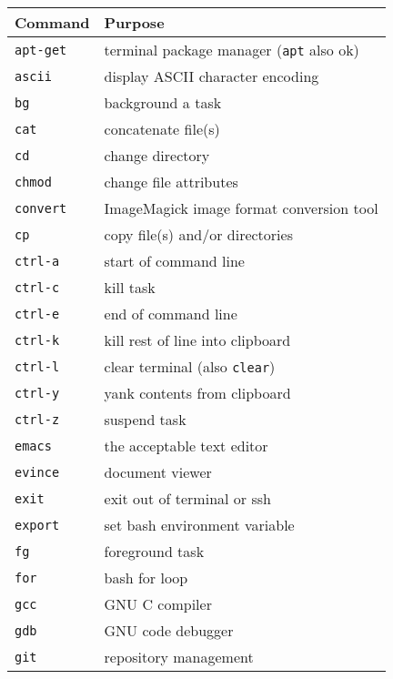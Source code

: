 \begin{table} %
    \centering
    \footnotesize
    \begin{tabular}{@{\makebox[3em][r]{\rownumber\space}}|l|l} \hline
    Command & Purpose \gdef\rownumber{\stepcounter{magicrownumbers}\arabic{magicrownumbers}} \\ \hline %
        \texttt{apt-get} & terminal package manager (\texttt{apt} also ok)\\
        \texttt{ascii} & display ASCII character encoding \\
        \texttt{bg} & background a task  \\
        \texttt{cat} & concatenate file(s)\\
        \texttt{cd} & change directory  \\
        \texttt{chmod} & change file attributes \\
        \texttt{convert} & ImageMagick image format conversion tool \\
        \texttt{cp} & copy file(s) and/or directories  \\
         \texttt{ctrl-a} & start of command line \\
        \texttt{ctrl-c} & kill task \\
         \texttt{ctrl-e} & end of command line \\
         \texttt{ctrl-k} & kill rest of line into clipboard \\
         \texttt{ctrl-l} & clear terminal (also \texttt{clear}) \\
         \texttt{ctrl-y} & yank contents from clipboard \\
        \texttt{ctrl-z} & suspend task\\
        \texttt{emacs} & the acceptable text editor\\
        \texttt{evince} & document viewer  \\
        \texttt{exit} & exit out of terminal or ssh \\
        \texttt{export} & set bash environment variable \\
        \texttt{fg} & foreground task  \\
        \texttt{for} & bash for loop\\
        \texttt{gcc} & GNU C compiler\\
        \texttt{gdb} & GNU code debugger\\
        \texttt{git} & repository management\\

\end{tabular}
\end{table}
